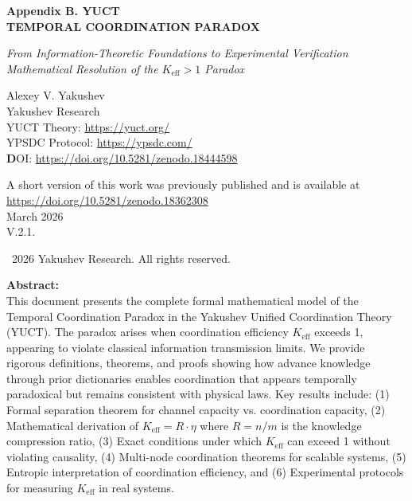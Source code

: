 \documentclass[12pt]{article}
\begin{document}
	\begin{titlepage}
		\begin{center}
			\vspace*{0cm}
			\Huge\textbf{Appendix B. YUCT\\
				TEMPORAL COORDINATION PARADOX}
			
			\vspace{0cm}
			\LARGE\textit{From Information-Theoretic Foundations to Experimental Verification \\
				Mathematical Resolution of the $K_{\text{eff}} > 1$ Paradox}
			
			\vspace{1cm}
			\Large
			Alexey V. Yakushev\\
			Yakushev Research\\
	YUCT Theory: \url{https://yuct.org/}\\
YPSDC Protocol: \url{https://ypsdc.com/}\\


\vspace{2cm}
\textbf DOI: \url{https://doi.org/10.5281/zenodo.18444598}\\

\vspace{1cm}

\vspace{0cm}
\large 
A short version of this work was previously published and is available at\\ \url{https://doi.org/10.5281/zenodo.18362308}\\
\vspace{1cm}
March 2026 \\ \large V.2.1.
			
			\vspace{5cm}
			\textcopyright~2026 Yakushev Research. All rights reserved.
			
			\newpage
			\vfill
			\normalsize
			\begin{minipage}{0.8\textwidth}
				\centering
				\textbf{Abstract:} \\ This document presents the complete formal mathematical model of the Temporal Coordination Paradox in the Yakushev Unified Coordination Theory (YUCT). The paradox arises when coordination efficiency $K_{\text{eff}}$ exceeds 1, appearing to violate classical information transmission limits. We provide rigorous definitions, theorems, and proofs showing how advance knowledge through prior dictionaries enables coordination that appears temporally paradoxical but remains consistent with physical laws. Key results include: (1) Formal separation theorem for channel capacity vs. coordination capacity, (2) Mathematical derivation of $K_{\text{eff}} = R \cdot \eta$ where $R = n/m$ is the knowledge compression ratio, (3) Exact conditions under which $K_{\text{eff}}$ can exceed 1 without violating causality, (4) Multi-node coordination theorems for scalable systems, (5) Entropic interpretation of coordination efficiency, and (6) Experimental protocols for measuring $K_{\text{eff}}$ in real systems.
			\end{minipage}
			

\end{center}
\end{titlepage}
\end{document}
